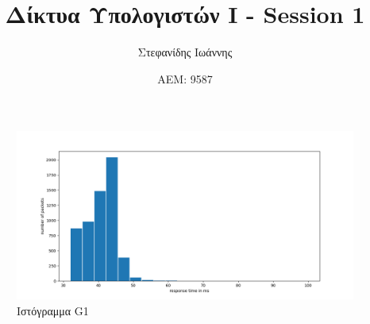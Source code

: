 \documentclass{article}
\title{Δίκτυα Υπολογιστών Ι - Session 1}
\author{Στεφανίδης Ιωάννης}
\date{ΑΕΜ: 9587}
\begin{document}
\maketitle

\begin{figure}[H]
  \centering
  \includegraphics[width=\textwidth]{G1.png}
  \caption{Ιστόγραμμα G1}
  \label{fig:G1}
\end{figure}
\end{document}
